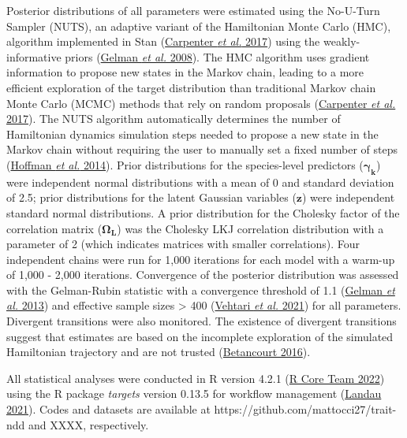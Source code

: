\documentclass[
  12pt,
  letterpaper,
  DIV=11,
  numbers=noendperiod]{scrartcl}
\begin{document}
Posterior distributions of all parameters were estimated using the
No-U-Turn Sampler (NUTS), an adaptive variant of the Hamiltonian Monte
Carlo (HMC), algorithm implemented in Stan
(\protect\hyperlink{ref-Carpenter2017}{Carpenter \emph{et al.} 2017})
using the weakly-informative priors
(\protect\hyperlink{ref-Gelman2008}{Gelman \emph{et al.} 2008}). The HMC
algorithm uses gradient information to propose new states in the Markov
chain, leading to a more efficient exploration of the target
distribution than traditional Markov chain Monte Carlo (MCMC) methods
that rely on random proposals
(\protect\hyperlink{ref-Carpenter2017}{Carpenter \emph{et al.} 2017}).
The NUTS algorithm automatically determines the number of Hamiltonian
dynamics simulation steps needed to propose a new state in the Markov
chain without requiring the user to manually set a fixed number of steps
(\protect\hyperlink{ref-Hoffman2014}{Hoffman \emph{et al.} 2014}). Prior
distributions for the species-level predictors
(\(\boldsymbol{\gamma_k}\)) were independent normal distributions with a
mean of 0 and standard deviation of 2.5; prior distributions for the
latent Gaussian variables (\(\boldsymbol{z}\)) were independent standard
normal distributions. A prior distribution for the Cholesky factor of
the correlation matrix (\(\boldsymbol{\Omega_L}\)) was the Cholesky LKJ
correlation distribution with a parameter of 2 (which indicates matrices
with smaller correlations). Four independent chains were run for 1,000
iterations for each model with a warm-up of 1,000 - 2,000 iterations.
Convergence of the posterior distribution was assessed with the
Gelman-Rubin statistic with a convergence threshold of 1.1
(\protect\hyperlink{ref-Gelman2013}{Gelman \emph{et al.} 2013}) and
effective sample sizes \textgreater{} 400
(\protect\hyperlink{ref-Vehtari2021}{Vehtari \emph{et al.} 2021}) for
all parameters. Divergent transitions were also monitored. The existence
of divergent transitions suggest that estimates are based on the
incomplete exploration of the simulated Hamiltonian trajectory and are
not trusted (\protect\hyperlink{ref-Betancourt2016}{Betancourt 2016}).

All statistical analyses were conducted in R version 4.2.1
(\protect\hyperlink{ref-RCoreTeam2022}{R Core Team 2022}) using the R
package \emph{targets} version 0.13.5 for workflow management
(\protect\hyperlink{ref-Landau2021}{Landau 2021}). Codes and datasets
are available at https://github.com/mattocci27/trait-ndd and XXXX,
respectively.

\newpage
\end{document}
